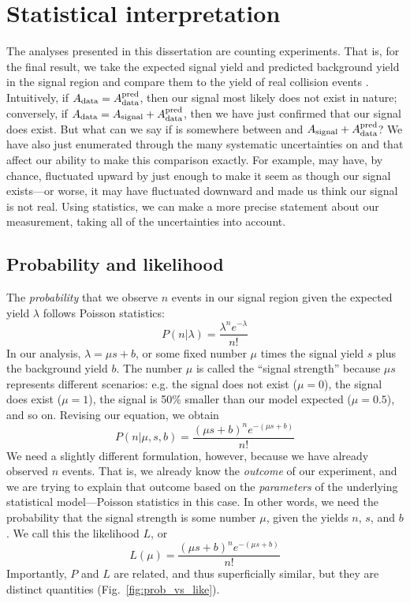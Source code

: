 \section{Statistical interpretation} %
The analyses presented in this dissertation are counting experiments. 
That is, for the final result, we take the expected signal yield \Asignal and predicted background yield \AdataPred in the signal region and compare them to the yield of real collision events \Adata. 
Intuitively, if $A_{\text{data}} = A_{\text{data}}^{\text{pred}}$, then our signal most likely does not exist in nature; conversely, if $A_{\text{data}} = A_{\text{signal}}+A_{\text{data}}^{\text{pred}}$, then we have just confirmed that our signal does exist. 
But what can we say if \Adata is somewhere between \AdataPred and $A_{\text{signal}}+A_{\text{data}}^{\text{pred}}$? 
We have also just enumerated through the many systematic uncertainties on \Asignal and \AdataPred that affect our ability to make this comparison exactly. 
For example, \AdataPred may have, by chance, fluctuated upward by just enough to make it seem as though our signal exists---or worse, it may have fluctuated downward and made us think our signal is not real. 
Using statistics, we can make a more precise statement about our measurement, taking all of the uncertainties into account. 

\subsection{Probability and likelihood}
The \textit{probability} that we observe $n$ events in our signal region given the expected yield $\lambda$ follows Poisson statistics:
\begin{equation}
    P(n|\lambda) = \frac{\lambda^n e^{-\lambda}}{n!}
\end{equation}
In our analysis, $\lambda = \mu s + b$, or some fixed number $\mu$ times the signal yield $s$ plus the background yield $b$. 
The number $\mu$ is called the ``signal strength'' because $\mu s$ represents different scenarios: e.g. the signal does not exist ($\mu = 0$), the signal does exist ($\mu = 1$), the signal is 50\% smaller than our model expected ($\mu = 0.5$), and so on. 
Revising our equation, we obtain
\begin{equation}
    P(n|\mu, s, b) = \frac{(\mu s + b)^n e^{-(\mu s + b)}}{n!}
\end{equation}
We need a slightly different formulation, however, because we have already observed $n$ events. 
That is, we already know the \textit{outcome} of our experiment, and we are trying to explain that outcome based on the \textit{parameters} of the underlying statistical model---Poisson statistics in this case. 
In other words, we need the probability that the signal strength is some number $\mu$, given the yields $n$, $s$, and $b$. 
We call this the likelihood $L$, or
\begin{equation}
    L(\mu) = \frac{(\mu s + b)^n e^{-(\mu s + b)}}{n!}
\end{equation}
Importantly, $P$ and $L$ are related, and thus superficially similar, but they are distinct quantities (Fig.~\ref{fig:prob_vs_like}). 


